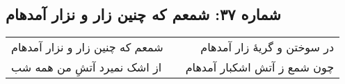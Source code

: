 \begin{center}
\section*{شماره ۳۷: شمعم که چنین زار و نزار آمدهام}
\label{sec:037}
\begin{longtable}{l p{0.5cm} r}
شمعم که چنین زار و نزار آمدهام
&&
در سوختن و گریهٔ زار آمدهام
\\
از اشک نمیرد آتشِ من همه شب
&&
چون شمع ز آتش اشکبار آمدهام
\\
\end{longtable}
\end{center}
